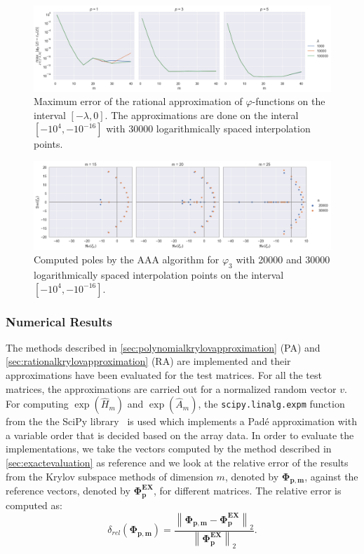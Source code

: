 \begin{figure}[h!]
    \centering
    \includegraphics[width=.9\textwidth]{img/AAA/errors_ms_log30k.png}
    \caption{
        Maximum error of the rational approximation of $\varphi$-functions on the interval
        $[-\lambda, 0]$.
        The approximations are done on the interal $[-10^4, -10^{-16}]$ with $30000$
        logarithmically spaced interpolation points.
    }
    \label{fig:errorsAAAms}
\end{figure}

\begin{figure}[h!]
    \centering
    \includegraphics[width=.9\textwidth]{img/AAA/poles_ms_log_p03.png}
    \caption{
        Computed poles by the AAA algorithm for $\varphi_3$ with 20000 and 30000
        logarithmically spaced interpolation points on the interval $[-10^{4}, -10^{-16}]$.
    }
    \label{fig:polesAAAms}
\end{figure}


\subsubsection*{Numerical Results}
The methods described in \autoref{sec:polynomialkrylovapproximation} (PA)
and \autoref{sec:rationalkrylovapproximation} (RA)
are implemented and their approximations have been evaluated for the test matrices.
For all the test matrices, the approximations are carried out for a normalized
random vector $v$.
For computing $\exp(\hat{H}_m)$ and $\exp(\hat{A}_m)$, the \texttt{scipy.linalg.expm}
function from the the SciPy library~\cite{SciPy2020} is used which implements a Padé
approximation with a variable order that is decided based on the array data.
In order to evaluate the implementations, we take the vectors computed by the method
described in \autoref{sec:exactevaluation} as reference and we look at the relative
error of the results from the Krylov subspace methods of dimension $m$, denoted by
$\mathbf{\Phi_{p, m}}$, against the reference vectors, denoted by $\mathbf{\Phi_p^{EX}}$,
for different matrices. The relative error is computed as:
\begin{equation*}
    \delta_{rel}(\mathbf{\Phi_{p, m}}) =
    \frac{\left\| \mathbf{\Phi_{p, m}} - \mathbf{\Phi_p^{EX}} \right\|_2}
    {\left\| \mathbf{\Phi_p^{EX}} \right\|_2}.
\end{equation*}

